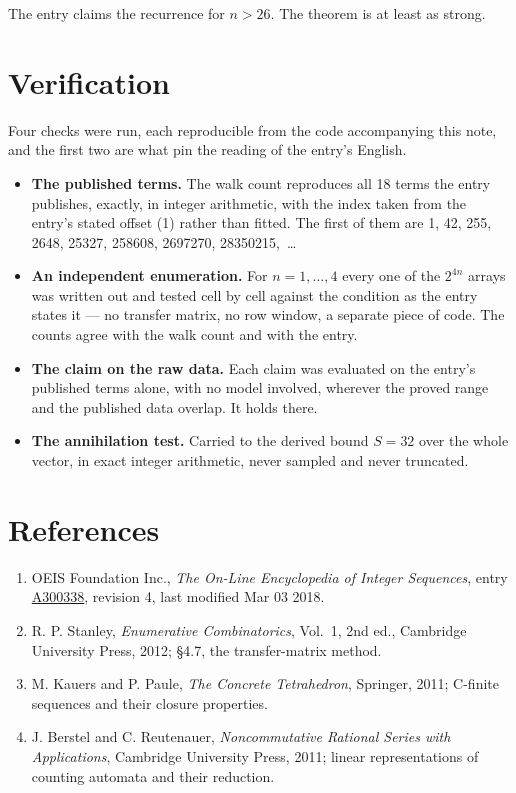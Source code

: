 \documentclass[11pt]{article}
\theoremstyle{definition}
\begin{document}
The entry claims the recurrence for $n > 26$. The theorem is at least as strong.

\section{Verification}

Four checks were run, each reproducible from the code accompanying this note, and the first two are what pin the reading of the entry's English.

\begin{itemize}

\item {\bfseries The published terms.} The walk count reproduces all 18 terms the entry publishes, exactly, in integer arithmetic, with the index taken from the entry's stated offset (1) rather than fitted. The first of them are 1, 42, 255, 2648, 25327, 258608, 2697270, 28350215,~\dots

\item {\bfseries An independent enumeration.} For $n = 1,\dots,4$ every one of the $2^{4n}$ arrays was written out and tested cell by cell against the condition as the entry states it --- no transfer matrix, no row window, a separate piece of code. The counts agree with the walk count and with the entry.

\item {\bfseries The claim on the raw data.} Each claim was evaluated on the entry's published terms alone, with no model involved, wherever the proved range and the published data overlap. It holds there.

\item {\bfseries The annihilation test.} Carried to the derived bound $S = 32$ over the whole vector, in exact integer arithmetic, never sampled and never truncated.

\end{itemize}

\section{References}

\begin{enumerate}

\item OEIS Foundation Inc., \emph{The On-Line Encyclopedia of Integer Sequences}, entry \href{https://oeis.org/A300338}{A300338}, revision 4, last modified Mar 03 2018.

\item R. P. Stanley, \emph{Enumerative Combinatorics}, Vol.~1, 2nd ed., Cambridge University Press, 2012; \S4.7, the transfer-matrix method.

\item M. Kauers and P. Paule, \emph{The Concrete Tetrahedron}, Springer, 2011; C-finite sequences and their closure properties.

\item J. Berstel and C. Reutenauer, \emph{Noncommutative Rational Series with Applications}, Cambridge University Press, 2011; linear representations of counting automata and their reduction.

\end{enumerate}
\end{document}
